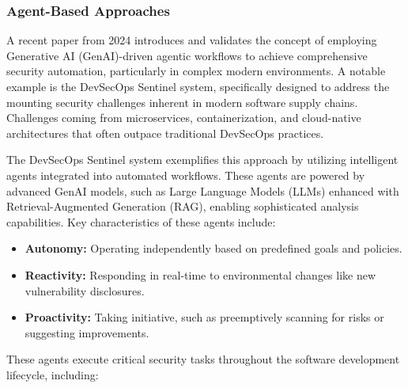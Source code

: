 


\subsubsection{Agent-Based Approaches} %
\label{sec:Agent-Based Approaches}

A recent paper from 2024 introduces and validates the concept of employing Generative AI (GenAI)-driven agentic workflows to achieve comprehensive security automation, particularly in complex modern environments. A notable example is the DevSecOps Sentinel system\cite{noauthor_devsecops_nodate}, specifically designed to address the mounting security challenges inherent in modern software supply chains. Challenges coming from microservices, containerization, and cloud-native architectures that often outpace traditional DevSecOps practices\cite{noauthor_devsecops_nodate}.

The DevSecOps Sentinel system exemplifies this approach by utilizing intelligent agents integrated into automated workflows. These agents are powered by advanced GenAI models, such as Large Language Models (LLMs) enhanced with Retrieval-Augmented Generation (RAG), enabling sophisticated analysis capabilities\cite{noauthor_devsecops_nodate}. Key characteristics of these agents include:

\begin{itemize}
    \item \textbf{Autonomy:} Operating independently based on predefined goals and policies.
    \item \textbf{Reactivity:} Responding in real-time to environmental changes like new vulnerability disclosures.
    \item \textbf{Proactivity:} Taking initiative, such as preemptively scanning for risks or suggesting improvements\cite{noauthor_devsecops_nodate}.
\end{itemize}

These agents execute critical security tasks throughout the software development lifecycle, including:

